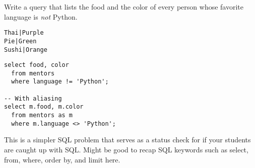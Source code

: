 \begin{blocksection}
\question Write a query that lists the food and the color of every person whose
favorite language is \emph{not} Python.

\begin{lstlisting}
Thai|Purple
Pie|Green
Sushi|Orange
\end{lstlisting}

\begin{solution}[1in]
\begin{lstlisting}
select food, color
  from mentors
  where language != 'Python';

-- With aliasing
select m.food, m.color
  from mentors as m
  where m.language <> 'Python';
\end{lstlisting}
\end{solution}
\end{blocksection}

\begin{blocksection}
\begin{guide}
This is a simpler SQL problem that serves as a status check for if your students are caught up with SQL. Might be good to recap SQL keywords such as select, from, where, order by, and limit here.
\end{guide}
\end{blocksection}
